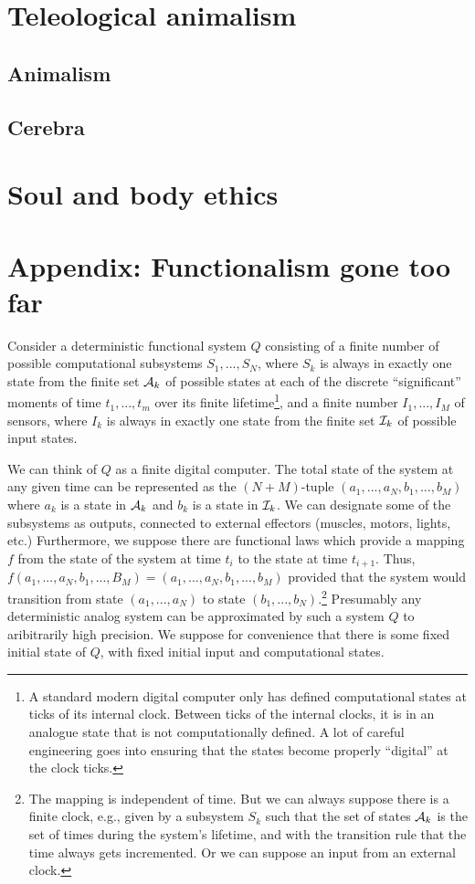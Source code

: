 \section{Teleological animalism}
\subsection{Animalism}
\subsection{Cerebra}
\section{Soul and body ethics}
\section*{Appendix: Functionalism gone too far}
Consider a deterministic functional system $Q$ consisting of a 
finite number of possible computational subsystems $S_1,...,S_N$, where $S_k$ is always in exactly one state from the finite set $\mathcal A_k$
of possible states at each of the discrete ``significant'' moments of time $t_1,...,t_m$ over its finite lifetime\footnote{A standard modern digital computer only has defined 
computational states at ticks of its internal clock. Between ticks of the internal clocks, it is in an analogue state that is not
computationally defined. A lot of careful engineering goes into ensuring that the states become properly ``digital'' at the clock ticks.}, and 
a finite number $I_1,...,I_M$ of sensors, where $I_k$ is always in exactly one state from the finite set $\mathcal I_k$ of possible input
states. 

We can think of $Q$ as a finite digital computer. The total state of the system at any given time can be represented as the
$(N+M)$-tuple $(a_1,...,a_N,b_1,...,b_M)$ where $a_k$ is a state in $\mathcal A_k$ and $b_k$ is a state in $\mathcal I_k$. We can designate some of
the subsystems as outputs, connected to external effectors (muscles, motors, lights, etc.)  Furthermore, we suppose there are functional laws which provide a 
mapping $f$ from the state of the system at time $t_i$ to the state at time $t_{i+1}$. Thus, $f(a_1,...,a_N,b_1,...,B_M)= (a_1,...,a_N,b_1,...,b_M)$ 
provided that the system would transition from state $(a_1,...,a_N)$ to state $(b_1,...,b_N)$.\footnote{The mapping is independent of time. But we 
can always suppose there is a finite clock, e.g., given by a subsystem $S_k$ such that the set of states $\mathcal A_k$ is
the set of times during the system's lifetime, and with the transition rule that the time always gets incremented. Or we can suppose an input
from an external clock.} Presumably any deterministic analog system can be approximated by such a system $Q$ to aribitrarily high precision.
We suppose for convenience that there is some fixed initial state of $Q$, with fixed initial input and computational states.

